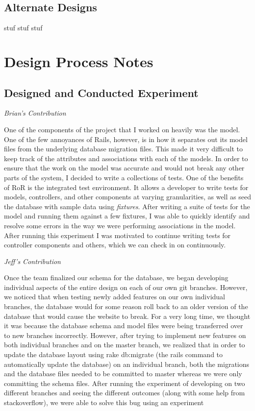 \documentclass[11pt]{article}
\begin{document}
\subsection{Alternate Designs}

stuf stuf stuf

\section{Design Process Notes}

\subsection{Designed and Conducted Experiment}

\textit{Brian's Contribution}

One of the components of the project that I worked on heavily was the model. One of the few annoyances of Rails, however, is in how it separates out its model files from the underlying database migration files. This made it very difficult to keep track of the attributes and associations with each of the models. In order to ensure that the work on the model was accurate and would not break any other parts of the system, I decided to write a collections of tests. One of the benefits of RoR is the integrated test environment. It allows a developer to write tests for models, controllers, and other components at varying granularities, as well as seed the database with sample data using \textit{fixtures}. After writing a suite of tests for the model and running them against a few fixtures, I was able to quickly identify and resolve some errors in the way we were performing associations in the model. After running this experiment I was motivated to continue writing tests for controller components and others, which we can check in on continuously. 

\textit{Jeff's Contribution}

Once the team finalized our schema for the database, we began developing individual aspects of the entire design on each of our own git branches.  However, we noticed that when testing newly added features on our own individual branches, the database would for some reason roll back to an older version of the database that would cause the website to break.  For a very long time, we thought it was because the database schema and model files were being transferred over to new branches incorrectly.  However, after trying to implement new features on both individual branches and on the master branch, we realized that in order to update the database layout using rake db:migrate (the rails command to automatically update the database) on an individual branch, both the migrations and the database files needed to be committed to master whereas we were only committing the schema files.  After running the experiment of developing on two different branches and seeing the different outcomes (along with some help from stackoverflow), we were able to solve this bug using an experiment
\end{document}
